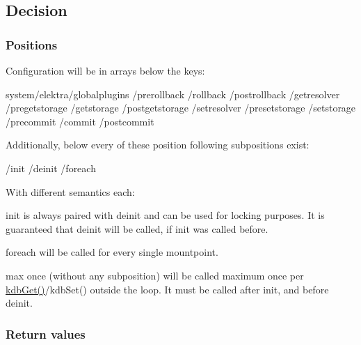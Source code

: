 \subsection*{Decision}

\subsubsection*{Positions}

Configuration will be in arrays below the keys\+: \begin{DoxyVerb}system/elektra/globalplugins
                             /prerollback
                             /rollback
                             /postrollback
                             /getresolver
                             /pregetstorage
                             /getstorage
                             /postgetstorage
                             /setresolver
                             /presetstorage
                             /setstorage
                             /precommit
                             /commit
                             /postcommit
\end{DoxyVerb}


Additionally, below every of these position following subpositions exist\+: \begin{DoxyVerb}                                        /init
                                        /deinit
                                        /foreach
\end{DoxyVerb}


With different semantics each\+:


\begin{DoxyItemize}
\item {\ttfamily init} is always paired with {\ttfamily deinit} and can be used for locking purposes. It is guaranteed that {\ttfamily deinit} will be called, if {\ttfamily init} was called before.
\item {\ttfamily foreach} will be called for every single mountpoint.
\item {\ttfamily max once} (without any subposition) will be called maximum once per {\ttfamily \hyperlink{group__kdb_ga28e385fd9cb7ccfe0b2f1ed2f62453a1}{kdb\+Get()}/kdb\+Set()} outside the loop. It must be called after {\ttfamily init}, and before {\ttfamily deinit}.
\end{DoxyItemize}

\subsubsection*{Return values}

